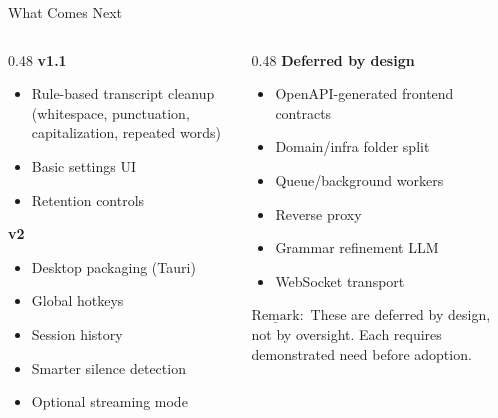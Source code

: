 \documentclass{beamer}
\newcommand{\rmk}{$\underline{\text{Remark}}:$ }
\begin{document}
\begin{frame}{What Comes Next}
    \small
    \begin{columns}[T]
        \begin{column}{0.48\textwidth}
            \textbf{v1.1}
            \begin{itemize}\setlength{\itemsep}{0pt}
                \item Rule-based transcript cleanup
                      (whitespace, punctuation,
                       capitalization, repeated words)
                \item Basic settings UI
                \item Retention controls
            \end{itemize}

            \vspace{0.2em}
            \textbf{v2}
            \begin{itemize}\setlength{\itemsep}{0pt}
                \item Desktop packaging (Tauri)
                \item Global hotkeys
                \item Session history
                \item Smarter silence detection
                \item Optional streaming mode
            \end{itemize}
        \end{column}
        \begin{column}{0.48\textwidth}
            \textbf{Deferred by design}
            \begin{itemize}\setlength{\itemsep}{0pt}
                \item OpenAPI-generated frontend contracts
                \item Domain/infra folder split
                \item Queue/background workers
                \item Reverse proxy
                \item Grammar refinement LLM
                \item WebSocket transport
            \end{itemize}

            \vspace{0.2em}
            {\footnotesize\rmk These are deferred by design,
            not by oversight. Each requires
            demonstrated need before adoption.}
        \end{column}
    \end{columns}
\end{frame}
\end{document}
